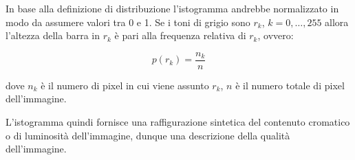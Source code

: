 \begin{definition}
    In base alla definizione di distribuzione l'istogramma andrebbe normalizzato
    in modo da assumere valori tra 0 e 1. Se i toni di grigio sono $r_k$, $k =
        0, \ldots, 255$ allora l'altezza della barra in $r_k$ è pari alla frequenza
    relativa di $r_k$, ovvero:

    $$
        p(r_k) = \frac{n_k}{n}
    $$

    dove $n_k$ è il numero di pixel in cui viene assunto $r_k$, $n$ è il numero
    totale di pixel dell'immagine.
\end{definition}

L'istogramma quindi fornisce una raffigurazione sintetica del contenuto cromatico o di luminosità dell'immagine, dunque una descrizione
della qualità dell'immagine.


